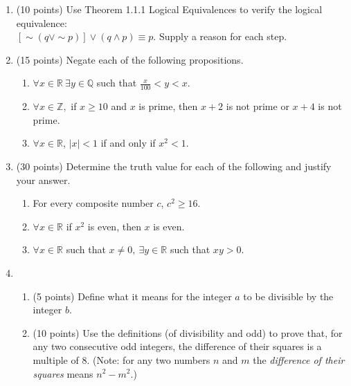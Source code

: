 \documentclass[12pt]{article}
\begin{document}
\begin{enumerate}
\item (10 points) Use Theorem 1.1.1 Logical Equivalences to verify the logical equivalence: \\
$[\sim(q \vee \sim p)] \vee (q \wedge p) \equiv p. $ Supply a reason for each step.
    \vfill
    \newpage

\item (15 points) Negate each of the following propositions.\\
\begin{enumerate}
\item $\forall x \in \mathbb{R} \: \exists y \in \mathbb{Q}$ such that $\frac{x}{100} < y < x.$\\
\vfill
\item $\forall x \in \mathbb{Z},$ if $x \geq 10$ and $x$ is prime, then $x+2$ is not prime or $x+4$ is not prime.
\vfill
\item $\forall x \in \mathbb{R}$, $|x|<1$ if and only if $x^2<1.$
\vfill
\end{enumerate}
\newpage

\item (30 points) Determine the truth value for each of the following and justify your answer.
\begin{enumerate}
\item For every composite number $c$, $c^2 \geq 16.$
\vfill
\item $\forall x \in \mathbb{R}$ if $x^2$ is even, then $x$ is even.
\vfill
\item $\forall x \in \mathbb{R}$ such that $x \not = 0, \: \exists y \in \mathbb{R}$ such that $xy > 0.$
\vfill
\end{enumerate}
\newpage

\item \begin{enumerate}
 \item (5 points) Define what it means for the integer $a$ to be divisible by the integer $b.$\\
 \vspace{1in}

 \item (10 points) Use the definitions (of divisibility and odd) to prove that, for any two consecutive odd integers, the difference of their squares is a multiple of 8. (Note: for any two numbers $n$ and $m$ the \emph{difference of their squares} means $n^2-m^2.$)
     \end{enumerate}


\end{enumerate}
\end{document}
